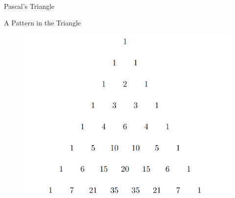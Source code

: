 \documentclass[aspectratio=169]{beamer}
\makeatletter
\newcommand\binomialCoefficient[2]{%
    \c@pgf@counta=#1%
    \c@pgf@countb=#2%
    \c@pgf@countc=\c@pgf@counta%
    \advance\c@pgf@countc by-\c@pgf@countb%
    \ifnum\c@pgf@countb>\c@pgf@countc%
        \c@pgf@countb=\c@pgf@countc%
    \fi%
    \c@pgf@countc=1%
    \c@pgf@countd=0%
    \pgfmathloop%
        \ifnum\c@pgf@countd<\c@pgf@countb%
        \multiply\c@pgf@countc by\c@pgf@counta%
        \advance\c@pgf@counta by-1%
        \advance\c@pgf@countd by1%
        \divide\c@pgf@countc by\c@pgf@countd%
    \repeatpgfmathloop%
    \the\c@pgf@countc%
}
\makeatother
\begin{document}
\begin{frame}{Pascal's Triangle}
\begin{figure}[htbp]
 \begin{minipage}{0.5\linewidth}
  \centering
 \end{minipage}%
 \pause %
 \begin{minipage}{0.5\linewidth}
  \centering
 \end{minipage}
\end{figure} 
\end{frame}

\begin{frame}{A Pattern in the Triangle}
    \begin{figure}
        \centering
        \includegraphics[scale=1]{images/Pascal8.png}
    \end{figure}
\end{frame}
\end{document}

